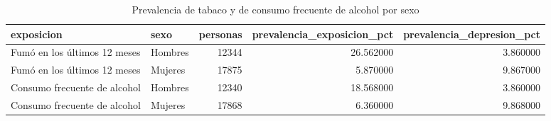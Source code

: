 \begin{table}[htbp]
\caption{Prevalencia de tabaco y de consumo frecuente de alcohol por sexo}
\label{tab:tabla_68_exposicion_por_sexo}
\begin{tabular}{llrrr}
\toprule
exposicion & sexo & personas & prevalencia\_exposicion\_pct & prevalencia\_depresion\_pct \\
\midrule
Fumó en los últimos 12 meses & Hombres & 12344 & 26.562000 & 3.860000 \\
Fumó en los últimos 12 meses & Mujeres & 17875 & 5.870000 & 9.867000 \\
Consumo frecuente de alcohol & Hombres & 12340 & 18.568000 & 3.860000 \\
Consumo frecuente de alcohol & Mujeres & 17868 & 6.360000 & 9.868000 \\
\bottomrule
\end{tabular}
\end{table}
